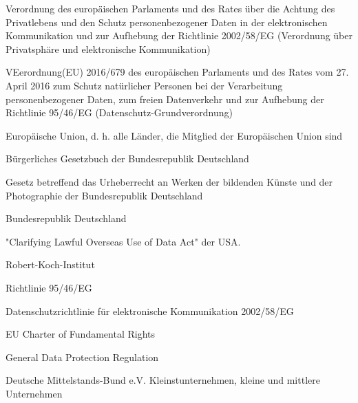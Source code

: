 {
    Verordnung des europäischen Parlaments und des Rates über die Achtung des
Privatlebens und den Schutz personenbezogener Daten in der elektronischen
Kommunikation und zur Aufhebung der Richtlinie 2002/58/EG (Verordnung über
Privatsphäre und elektronische Kommunikation)
}

{
    VEerordnung(EU) 2016/679 des europäischen Parlaments und des Rates vom 27. April 2016 zum Schutz natürlicher Personen bei der Verarbeitung personenbezogener Daten, zum freien Datenverkehr und zur Aufhebung der Richtlinie 95/46/EG (Datenschutz-Grundverordnung)
}

{  
    Europäische Union, d. h. alle Länder, die Mitglied der Europäischen Union sind
}

{
    Bürgerliches Gesetzbuch der Bundesrepublik Deutschland
}

{
    Gesetz betreffend das Urheberrecht an Werken der bildenden Künste und der Photographie der Bundesrepublik Deutschland
}

{
    Bundesrepublik Deutschland
}

{
    "Clarifying Lawful Overseas Use of Data Act" der USA.
}

{
    Robert-Koch-Institut
}

{
    Richtlinie 95/46/EG
}

{
    Datenschutzrichtlinie für elektronische Kommunikation 2002/58/EG
}

{
    EU Charter of Fundamental Rights
}

{
    General Data Protection Regulation
}

{
    Deutsche Mittelstands-Bund e.V.
}
{
    Kleinstunternehmen, kleine und mittlere Unternehmen
}

\pagebreak
